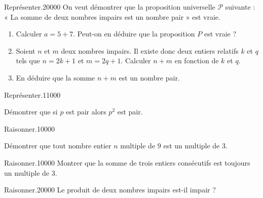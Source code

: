 \begin{pageParcoursd} 



\begin{ExoCdN}{Représenter.}{2}{0}{0}{0}{0}
On veut démontrer que la proposition universelle $\mathcal P$ suivante : « La somme de deux nombres impairs est un nombre pair » est vraie.

\begin{enumerate}
\item Calculer $a=5+7$. Peut-on en déduire que la proposition $P$
  est vraie ? %
\item Soient $n$ et $m$ deux nombres impairs. Il existe donc deux entiers
  relatifs $k$ et $q$ tels que $n=2k+1$ et $m=2q+1$.
  Calculer $n+m$ en fonction de $k$ et $q$. 
\item En déduire que la somme $n+m$ est un nombre pair. 
\end{enumerate}

\end{ExoCdN}

 
\begin{ExoCdN}{Représenter.}{1}{1}{0}{0}{0}

  
Démontrer que si $p$ est pair alors $p^2$ est pair.


 
\end{ExoCdN}

\begin{ExoCdN}{Raisonner.}{1}{0}{0}{0}{0}

Démontrer que tout nombre entier $n$ multiple de $9$ est un multiple de $3$.  

\end{ExoCdN}

\begin{ExoCdN}{Raisonner.}{1}{0}{0}{0}{0}
Montrer que la somme de trois entiers consécutifs est toujours un multiple de 3. 
\end{ExoCdN}


\begin{ExoCdN}{Raisonner.}{2}{0}{0}{0}{0}
Le produit de deux nombres impairs est-il impair ? 
\end{ExoCdN}





\end{pageParcoursd}
 
